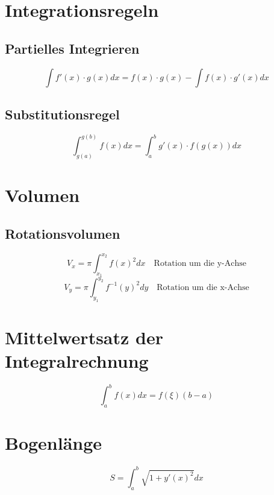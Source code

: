 \section{Integrationsregeln}
\subsection{Partielles Integrieren}
\[ \boxed{\int f'(x) \cdot g(x) dx = f(x) \cdot g(x) - \int f(x) \cdot g'(x) dx} \]
\subsection{Substitutionsregel}
\[ \boxed{\int_{g(a)}^{g(b)} f(x) dx = \int_{a}^{b} g'(x) \cdot f(g(x)) dx} \]


\section{Volumen}
\subsection{Rotationsvolumen}
\[ \boxed{V_x = \pi \int_{x_1}^{x_2} f(x)^2 dx} \quad \text{Rotation um die y-Achse}\]
\[ \boxed{V_y = \pi \int_{y_1}^{y_2} f^{-1}(y)^2 dy} \quad \text{Rotation um die x-Achse}\]

\section{Mittelwertsatz der Integralrechnung}
\[ \boxed{\int_{a}^{b} f(x) dx = f(\xi)(b-a)} \]

\section{Bogenlänge}
\[ \boxed{S = \int_{a}^{b} \sqrt{1 + y'(x)^2} dx} \]
